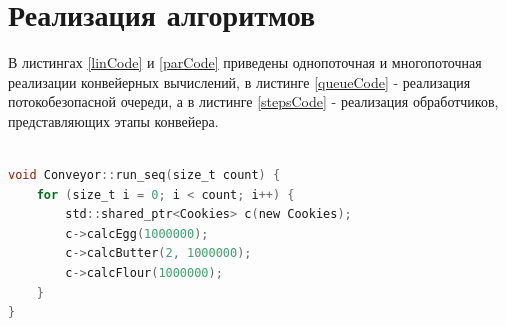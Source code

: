 \documentclass[12pt]{report}
\begin{document}
\section{Реализация алгоритмов}

В листингах \ref{linCode} и \ref{parCode} приведены однопоточная и многопоточная реализации конвейерных вычислений, в листинге \ref{queueCode} - реализация потокобезопасной очереди, а в листинге \ref{stepsCode} - реализация обработчиков, представляющих этапы конвейера.
\begin{lstlisting}[label=linCode,caption=Однопоточная реализация конвейера,language=C]

void Conveyor::run_seq(size_t count) {
    for (size_t i = 0; i < count; i++) {
        std::shared_ptr<Cookies> c(new Cookies);
        c->calcEgg(1000000);
        c->calcButter(2, 1000000);
        c->calcFlour(1000000);
    }
}
\end{lstlisting}
\end{document}
